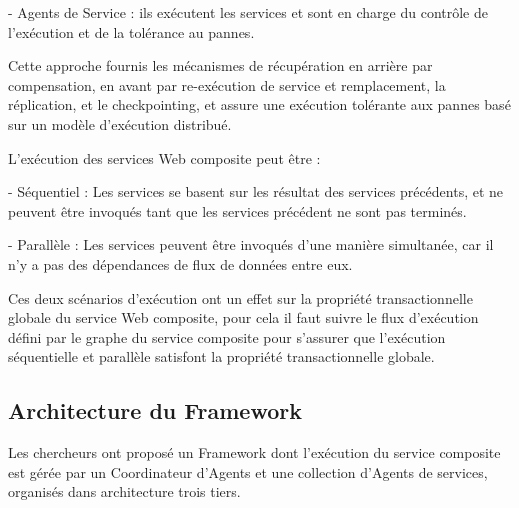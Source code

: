 - Agents de Service : ils exécutent les services et sont en charge du contrôle de l'exécution et de la tolérance au pannes.

Cette approche fournis les mécanismes de récupération en arrière par compensation, en avant par re-exécution de service et remplacement, la réplication, et le checkpointing, et assure une exécution tolérante aux pannes basé sur un modèle d'exécution distribué.

L'exécution des services Web composite peut être \cite{3} : 

- Séquentiel : Les services se basent sur les résultat des services précédents, et ne peuvent être invoqués tant que les services précédent ne sont pas terminés.

- Parallèle : Les services peuvent être invoqués d'une manière simultanée, car il n'y a pas des dépendances de flux de données entre eux.

Ces deux scénarios d'exécution ont un effet sur la propriété transactionnelle globale du service Web composite, pour cela il faut suivre le flux d'exécution défini par le graphe du service composite pour s'assurer que l'exécution séquentielle et parallèle satisfont la propriété transactionnelle globale.

\subsection{Architecture du Framework}

Les chercheurs ont proposé un Framework dont l'exécution du service composite est gérée par un Coordinateur d'Agents et une collection d'Agents de services, organisés dans architecture trois tiers.

